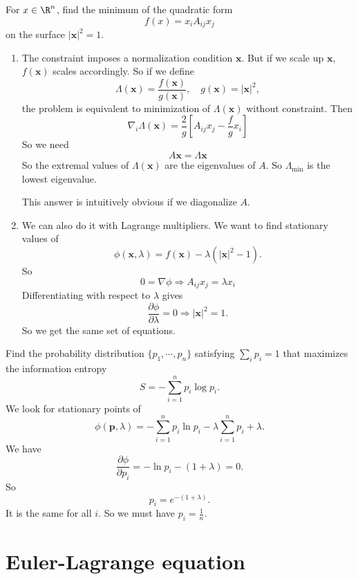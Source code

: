 \documentclass[a4paper]{article}
\begin{document}
\begin{eg}
  For $x\in \R^n$, find the minimum of the quadratic form
  \[
    f(x) = x_i A_{ij}x_j
  \]
  on the surface $|\mathbf{x}|^2 = 1$.

  \begin{enumerate}
  \item The constraint imposes a normalization condition $\mathbf{x}$. But if we scale up $\mathbf{x}$, $f(\mathbf{x})$ scales accordingly. So if we define
    \[
      \Lambda(\mathbf{x}) = \frac{f(\mathbf{x})}{g(\mathbf{x})},\quad g(\mathbf{x}) = |\mathbf{x}|^2,
    \]
    the problem is equivalent to minimization of $\Lambda (\mathbf{x})$ without constraint. Then
    \[
      \nabla_i \Lambda(\mathbf{x}) = \frac{2}{g}\left[A_{ij} x_j - \frac{f}{g} x_i\right]
    \]
    So we need
    \[
      A\mathbf{x} = \Lambda \mathbf{x}
    \]
    So the extremal values of $\Lambda (\mathbf{x})$ are the eigenvalues of $A$. So $\Lambda_{\min}$ is the lowest eigenvalue.

    This answer is intuitively obvious if we diagonalize $A$.

  \item We can also do it with Lagrange multipliers. We want to find stationary values of
    \[
      \phi(\mathbf{x}, \lambda) = f(\mathbf{x}) - \lambda(|\mathbf{x}|^2 - 1).
    \]
    So
    \[
      0 = \nabla \phi \Rightarrow A_{ij} x_j = \lambda x_i
    \]
    Differentiating with respect to $\lambda$ gives
    \[
      \frac{\partial \phi}{\partial \lambda} = 0 \Rightarrow |\mathbf{x}|^2 = 1.
    \]
    So we get the same set of equations.
  \end{enumerate}
\end{eg}

\begin{eg}
  Find the probability distribution $\{p_1, \cdots, p_n\}$ satisfying $\sum_i p_i = 1$ that maximizes the information entropy
  \[
    S = - \sum_{i = 1}^n p_i \log p_i.
  \]
  We look for stationary points of
  \[
    \phi(\mathbf{p}, \lambda) = -\sum_{i = 1}^n p_i \ln p_i - \lambda\sum_{i = 1}^n p_i + \lambda.
  \]
  We have
  \[
    \frac{\partial \phi}{\partial p_i}= - \ln p_i - (1 + \lambda) = 0.
  \]
  So
  \[
    p_i = e^{-(1 + \lambda)}.
  \]
  It is the same for all $i$. So we must have $p_i = \frac{1}{n}$.
\end{eg}

\section{Euler-Lagrange equation}
\end{document}
